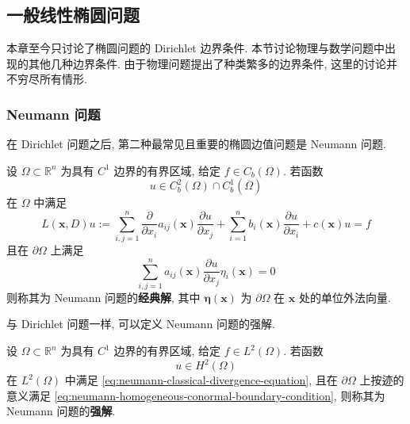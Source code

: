 \subsection{一般线性椭圆问题}\label{sec:general-linear-elliptic-problems}

本章至今只讨论了椭圆问题的 Dirichlet 边界条件. 本节讨论物理与数学问题中出现的其他几种边界条件. 由于物理问题提出了种类繁多的边界条件, 这里的讨论并不穷尽所有情形.

\subsubsection{Neumann 问题}\label{subsec:neumann-problem}

在 Dirichlet 问题之后, 第二种最常见且重要的椭圆边值问题是 Neumann 问题.

\begin{Definition}
\label{def:classical-neumann-solution}
设 $\Omega\subset\mathbb{R}^n$ 为具有 $C^1$ 边界的有界区域, 给定 $f\in C_b(\Omega)$. 若函数\[u\in C_b^2(\Omega)\cap C_b^1(\overline\Omega)\]在 $\Omega$ 中满足
\begin{equation}\label{eq:neumann-classical-divergence-equation}
L(\bm{x},D)u:=\sum_{i,j=1}^n\frac{\partial}{\partial x_i}a_{ij}(\bm{x})\frac{\partial u}{\partial x_j}+\sum_{i=1}^nb_i(\bm{x})\frac{\partial u}{\partial x_i}+c(\bm{x})u=f
\end{equation}
且在 $\partial\Omega$ 上满足
\begin{equation}\label{eq:neumann-homogeneous-conormal-boundary-condition}
\sum_{i,j=1}^na_{ij}(\bm{x})\frac{\partial u}{\partial x_j}\eta_i(\bm{x})=0
\end{equation}
则称其为 Neumann 问题的\textbf{经典解}, 其中 $\bm{\eta}(\bm{x})$ 为 $\partial\Omega$ 在 $\bm{x}$ 处的单位外法向量.
\end{Definition}

与 Dirichlet 问题一样, 可以定义 Neumann 问题的强解.

\begin{Definition}
\label{def:strong-neumann-solution}
设 $\Omega\subset\mathbb{R}^n$ 为具有 $C^1$ 边界的有界区域, 给定 $f\in L^2(\Omega)$. 若函数\[u\in H^2(\Omega)\]在 $L^2(\Omega)$ 中满足 \eqref{eq:neumann-classical-divergence-equation}, 且在 $\partial\Omega$ 上按迹的意义满足 \eqref{eq:neumann-homogeneous-conormal-boundary-condition}, 则称其为 Neumann 问题的\textbf{强解}.
\end{Definition}

